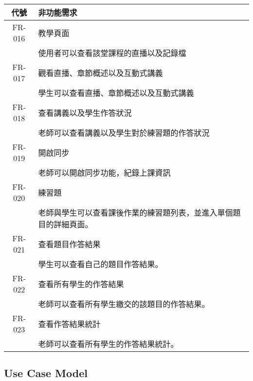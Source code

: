 \documentclass[12pt]{article}
\begin{document}
\begin{table}[H]
  \centering
  \begin{tabular}{|c|p{10cm}|}
    \hline
    \textbf{代號} & \textbf{非功能需求} \\
    \hline
    FR-016 & 教學頁面 \\ 
    & 使用者可以查看該堂課程的直播以及記錄檔 \\  \hline
    FR-017 & 觀看直播、章節概述以及互動式講義 \\ 
    & 學生可以查看直播、章節概述以及互動式講義 \\  \hline
    FR-018 & 查看講義以及學生作答狀況 \\ 
    & 老師可以查看講義以及學生對於練習題的作答狀況 \\  \hline
    FR-019 & 開啟同步 \\ 
    & 老師可以開啟同步功能，紀錄上課資訊 \\  \hline
    FR-020 & 練習題 \\ 
    & 老師與學生可以查看課後作業的練習題列表，並進入單個題目的詳細頁面。\\ \hline
    FR-021 & 查看題目作答結果 \\ 
    & 學生可以查看自己的題目作答結果。 \\ \hline
    FR-022 & 查看所有學生的作答結果 \\ 
    & 老師可以查看所有學生繳交的該題目的作答結果。 \\ \hline 
    FR-023 & 查看作答結果統計 \\ 
    & 老師可以查看所有學生的作答結果統計。 \\ \hline
  \end{tabular}
\end{table}

\subsection{Use Case Model}
\end{document}
